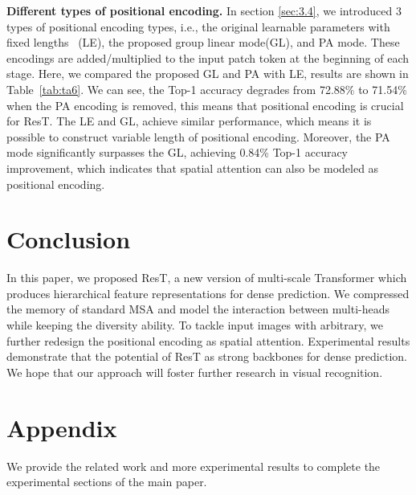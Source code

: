 \documentclass{article}
\begin{document}
\textbf{Different types of positional encoding.} In section \ref{sec:3.4}, we introduced 3 types of positional encoding types, i.e., the original learnable parameters with fixed lengths~\cite{DBLP:journals/corr/abs-2010-11929} (LE), the proposed group linear mode(GL), and PA mode. These encodings are added/multiplied to the input patch token at the beginning of each stage. Here, we compared the proposed GL and PA with LE, results are shown in Table~\ref{tab:ta6}. We can see, the Top-1 accuracy degrades from 72.88\% to 71.54\% when the PA encoding is removed, this means that positional encoding is crucial for ResT. The LE and GL, achieve similar performance, which means it is possible to construct variable length of positional encoding. Moreover, the PA mode significantly surpasses the GL, achieving 0.84\% Top-1 accuracy improvement, which indicates that spatial attention can also be modeled as positional encoding.  

\section{Conclusion}
In this paper, we proposed ResT, a new version of multi-scale Transformer which produces hierarchical feature representations for dense prediction. We compressed the memory of standard MSA and model the interaction between multi-heads while keeping the diversity ability. To tackle input images with arbitrary, we further redesign the positional encoding as spatial attention.
Experimental results demonstrate that the potential of ResT as strong backbones for dense prediction. We hope that our approach will foster further research in visual recognition. 



{\small
	
	
}


\appendix

\section{Appendix}
We provide the related work and more experimental results to complete the experimental sections of the main paper.
\end{document}
